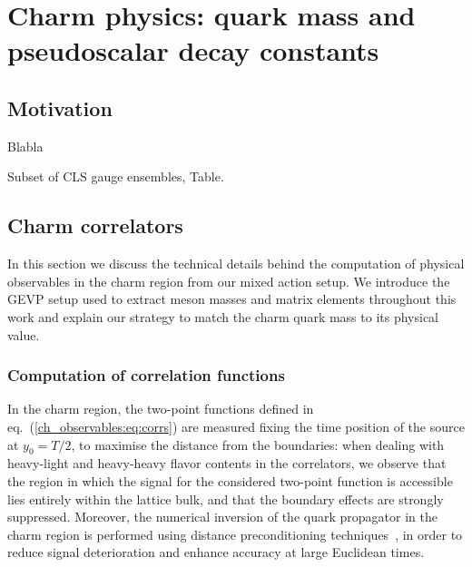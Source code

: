 \chapter{Charm physics: quark mass and pseudoscalar decay constants}%
\label{ch_charm}


\section{Motivation}
\label{ch_qm:sec:introduction}

Blabla~\citep{charm}

Subset of CLS gauge ensembles, Table.


\section{Charm correlators}
\label{sec:charm_basics}

In this section we discuss the technical details behind the computation of physical observables in the charm region from our mixed action setup. We  introduce the GEVP setup used to extract meson masses and matrix elements throughout this work and explain our strategy to match the charm quark mass to its physical value.

\subsection{Computation of correlation functions}

In the charm region, the two-point functions defined in eq.~(\ref{ch_observables:eq:corrs}) are measured fixing the time position of the source at $y_0=T/2$, to maximise the distance from the boundaries: when dealing with heavy-light and heavy-heavy flavor contents in the correlators, we observe that the region in which the signal for the considered two-point function is accessible lies entirely within the lattice bulk, and that the boundary effects are strongly suppressed. Moreover, the numerical inversion of the quark propagator in the charm region is performed using distance preconditioning techniques~\cite{deDivitiis:2010ya,Collins:2017iud}, in order to reduce signal deterioration and enhance accuracy at large  Euclidean times.

